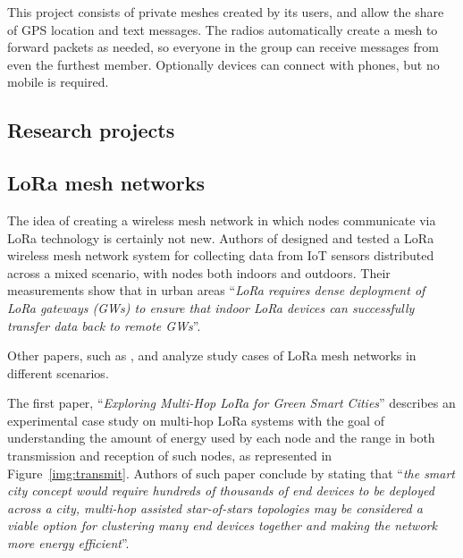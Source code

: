 					This project consists of private meshes created by its users, and allow the share of GPS location and text messages.					
					The radios automatically create a mesh to forward packets as needed, so everyone in the group can receive messages from even the furthest member. 
					Optionally devices can connect with phones, but no mobile is required.
		
		\subsection{Research projects}
		
			\subsection{LoRa mesh networks}
			
				The idea of creating a wireless mesh network in which nodes communicate via LoRa technology is certainly not new.
				Authors of \cite{8326735} designed and tested a LoRa wireless mesh network system for collecting data from IoT sensors distributed across a mixed scenario, with nodes both indoors and outdoors.
				Their measurements show that in urban areas ``\textit{LoRa requires dense deployment of LoRa gateways (GWs) to ensure that indoor LoRa devices can successfully transfer data back to remote GWs}''.

				Other papers, such as \cite{8884231}, \cite{8792890} and \cite{9342944} analyze study cases of LoRa mesh networks in different scenarios.
				
				The first paper, ``\textit{Exploring Multi-Hop LoRa for Green Smart Cities}'' \cite{8884231} describes an experimental case study on multi-hop LoRa systems with the goal of understanding the amount of energy used by each node and the range in both transmission and reception of such nodes, as represented in Figure~\ref{img:transmit}.
				Authors of such paper conclude by stating that ``\textit{the smart city concept would require hundreds of thousands of end devices to be deployed across a city, multi-hop assisted star-of-stars topologies may be considered a viable option for clustering many end devices together and making the network more energy efficient}''.
				
